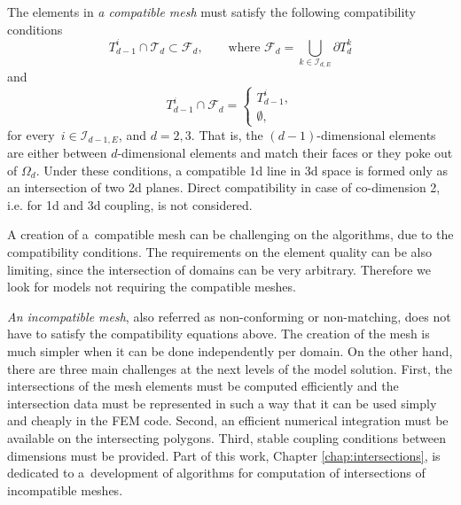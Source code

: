 The elements in \emph{a compatible mesh} must satisfy the following compatibility conditions
\begin{equation}
        T_{d-1}^i \cap \mathcal{T}_d \subset \mathcal{F}_d,  \qquad \text{where } \mathcal{F}_d = \bigcup_{k\in\mathcal{I}_{d,E}} \partial T_{d}^{k}
\end{equation}
and
\begin{equation}
        T_{d-1}^i \cap \mathcal{F}_d = 
        \begin{cases}
            T_{d-1}^i, \\
            \emptyset,
        \end{cases}
\end{equation}
for every $\,i\in\mathcal{I}_{d-1,E}$, and $d=2,3$. 
That is, the $(d-1)$-dimensional elements are either between $d$-dimensional elements and
match their faces or they poke out of $\Omega_d$. 
Under these conditions, a compatible 1d line in 3d space is formed only as an intersection of 
two 2d planes.
Direct compatibility in case of co-dimension 2, i.e. for 1d and 3d coupling, is not considered.


A creation of a~compatible mesh can be challenging on the algorithms, due to the compatibility conditions.
The requirements on the element quality can be also limiting, since the intersection of domains can be very arbitrary.
Therefore we look for models not requiring the compatible meshes.

\emph{An incompatible mesh}, also referred as non-conforming or non-matching, does not have to satisfy the compatibility equations above.
The creation of the mesh is much simpler when it can be done independently per domain.
On the other hand, there are three main challenges at the next levels of the model solution.
First, the intersections of the mesh elements must be computed efficiently and the intersection data
must be represented in such a way that it can be used simply and cheaply in the FEM code.
Second, an efficient numerical integration must be available on the intersecting polygons.
Third, stable coupling conditions between dimensions must be provided.
Part of this work, Chapter \ref{chap:intersections}, is dedicated to a~development of algorithms
for computation of intersections of incompatible meshes.







